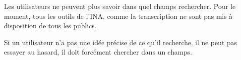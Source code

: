 Les utilisateurs ne peuvent plus savoir dans quel champs rechercher. Pour le moment, tous les outils de l'INA, comme la transcription ne sont pas mis à disposition de tous les publics. 

Si un utilisateur n'a pas une idée précise de ce qu'il recherche, il ne peut pas essayer au hasard, il doit forcément chercher dans un champs. 
